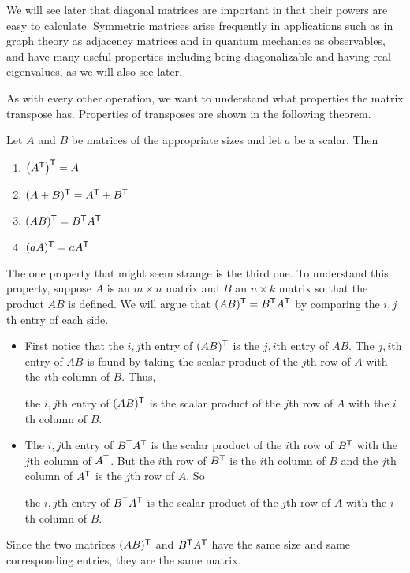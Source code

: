 We will see later that diagonal matrices are important in that their powers are easy to calculate. Symmetric matrices arise frequently in applications such as in graph theory as adjacency matrices and in quantum mechanics as observables, and have many useful properties including being diagonalizable and having real eigenvalues, as we will also see later. 


As with every other operation, we want to understand what properties the matrix transpose has. Properties of transposes are shown in the following theorem.



\begin{theorem} \label{thm:transpose_props} Let $A$ and $B$ be matrices of the appropriate sizes and let $a$ be a scalar. Then
\begin{enumerate}
\item $\left(A^{\mathsf{T}}\right)^{\mathsf{T}} = A$
\item $(A+B)^{\mathsf{T}} = A^{\mathsf{T}} + B^{\mathsf{T}}$
\item $(AB)^{\mathsf{T}} = B^{\mathsf{T}}A^{\mathsf{T}}$
\item $(aA)^{\mathsf{T}} = aA^{\mathsf{T}}$
\end{enumerate}
\end{theorem}



The one property that might seem strange is the third one. To understand this property, suppose $A$ is an $m \times n$ matrix and $B$ an $n \times k$ matrix so that the product $AB$ is defined. We will argue that $(AB)^{\mathsf{T}} = B^{\mathsf{T}}A^{\mathsf{T}}$ by comparing the $i,j$th entry of each side.
\begin{itemize}
\item First notice that the $i,j$th entry of $(AB)^{\mathsf{T}}$ is the $j,i$th entry of $AB$. The $j,i$th entry of $AB$ is found by taking the scalar product of the $j$th row of $A$ with the $i$th column of $B$. Thus,
\begin{center} the $i,j$th entry of $(AB)^{\mathsf{T}}$ is the scalar product of the $j$th row of $A$ with the $i$th column of $B$. \end{center}
\item The $i,j$th entry of $B^{\mathsf{T}}A^{\mathsf{T}}$ is the scalar product of the $i$th row of $B^{\mathsf{T}}$ with the $j$th column of $A^{\mathsf{T}}$. But the $i$th row of $B^{\mathsf{T}}$ is the $i$th column of $B$ and the $j$th column of $A^{\mathsf{T}}$ is the $j$th row of $A$. So
\begin{center} the $i,j$th entry of $B^{\mathsf{T}}A^{\mathsf{T}}$ is the scalar product of the $j$th row of $A$ with the $i$th column of $B$. \end{center}
\end{itemize}
Since the two matrices  $(AB)^{\mathsf{T}}$ and $B^{\mathsf{T}}A^{\mathsf{T}}$ have the same size and same corresponding entries, they are the same matrix.

